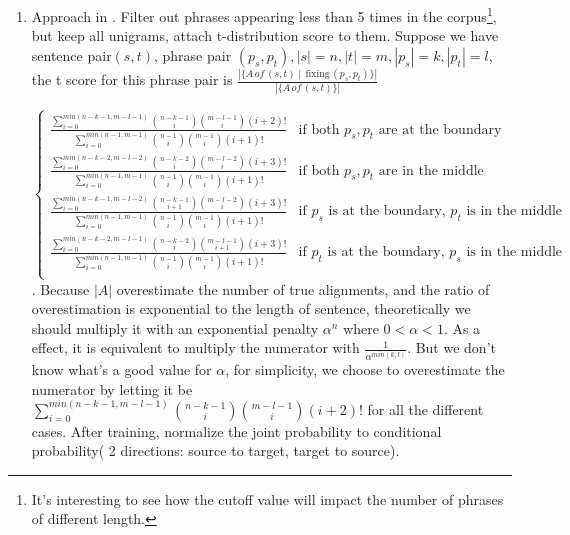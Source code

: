 \documentclass[11pt, letterpaper]{article}   	%
\begin{document}
\begin{enumerate}
\item \label{app1} Approach in \cite{marcu-wong-02}. Filter out phrases appearing less than 5 times in the corpus\footnote{It's interesting to see how the cutoff value will impact the number of phrases of different length.}, but keep all unigrams, attach t-distribution score to them.
Suppose we have sentence pair$(s,t)$, phrase pair $(p_s,p_t), |s|=n, |t|=m,|p_s|=k,|p_t|=l$, the t score for this phrase pair is $\frac{|\{A \,of \,(s,t) \mid \,\text{fixing}\, (p_s,p_t)\}|}{|\{A\,of \,(s,t)\}|}$

\begin{equation}
\begin{cases}
\frac
{\sum \limits_{i=0}^{min(n-k-1,m-l-1)} {n-k-1 \choose i}{m-l-1 \choose i}(i+2)! }
{\sum \limits_{i=0}^{min(n-1,m-1)} {n-1 \choose i}{m-1 \choose i}(i+1)! }  & \text{if both $p_s, p_t$ are at the boundary} \\
\frac
{\sum \limits_{i=0}^{min(n-k-2,m-l-2)} {n-k-2 \choose i}{m-l-2 \choose i}(i+3)! }
{\sum \limits_{i=0}^{min(n-1,m-1)} {n-1 \choose i}{m-1 \choose i}(i+1)! }  & \text{if both $p_s,p_t$ are in the middle} \\
\frac
{\sum \limits_{i=0}^{min(n-k-1,m-l-2)} {n-k-1 \choose i+1}{m-l-2 \choose i}(i+3)! }
{\sum \limits_{i=0}^{min(n-1,m-1)} {n-1 \choose i}{m-1 \choose i}(i+1)! }  & \text{if $p_s$ is at the boundary, $p_t$ is in the middle} \\
\frac
{\sum \limits_{i=0}^{min(n-k-2,m-l-1)} {n-k-2 \choose i}{m-l-1 \choose i+1}(i+3)! }
{\sum \limits_{i=0}^{min(n-1,m-1)} {n-1 \choose i}{m-1 \choose i}(i+1)! }  & \text{if $p_t$ is at the boundary, $p_s$ is in the middle} \\
\end{cases}
\end{equation}. 
Because $|A|$ overestimate the number of true alignments, and the ratio of overestimation is exponential to the length of sentence, theoretically we should multiply it with an exponential penalty $\alpha^n$ where $0<\alpha<1$. As a effect, it is equivalent to multiply the numerator with $\frac{1}{\alpha^{min(k,l)}}$. But we don't know what's a good value for $\alpha$, for simplicity, we choose to overestimate the numerator by letting it be ${\sum \limits_{i=0}^{min(n-k-1,m-l-1)} {n-k-1 \choose i}{m-l-1 \choose i}(i+2)! }$ for all the different cases. After training, \cite{marcu-wong-02} normalize the joint probability to conditional probability( 2 directions: source to target, target to source).


\end{enumerate}
\end{document}
